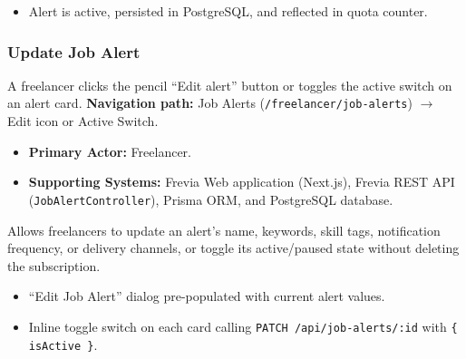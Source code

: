 \begin{itemize}[leftmargin=1.6em,topsep=3pt,itemsep=2pt,parsep=0pt,label=$\bullet$]
    \item Alert is active, persisted in PostgreSQL, and reflected in quota counter.
\end{itemize}

\subsubsection{Update Job Alert}

A freelancer clicks the pencil ``Edit alert'' button or toggles the active switch on an alert card.\newline
\textbf{Navigation path:} Job Alerts (\texttt{/freelancer/job-alerts}) $\rightarrow$ Edit icon or Active Switch.


\begin{itemize}[leftmargin=1.6em,topsep=3pt,itemsep=2pt,parsep=0pt,label=$\bullet$]
    \item \textbf{Primary Actor:} Freelancer.
    \item \textbf{Supporting Systems:} Frevia Web application (Next.js), Frevia REST API (\texttt{JobAlertController}), Prisma ORM, and PostgreSQL database.
\end{itemize}

\noindent Allows freelancers to update an alert's name, keywords, skill tags, notification frequency, or delivery channels, or toggle its active/paused state without deleting the subscription.

\begin{itemize}[leftmargin=1.6em,topsep=3pt,itemsep=2pt,parsep=0pt,label=$\bullet$]
    \item ``Edit Job Alert'' dialog pre-populated with current alert values.
    \item Inline toggle switch on each card calling \texttt{PATCH /api/job-alerts/:id} with \texttt{\{ isActive \}}.
\end{itemize}


